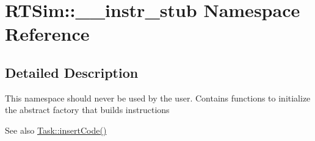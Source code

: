 \hypertarget{namespaceRTSim_1_1____instr__stub}{}\section{R\+T\+Sim\+:\+:\+\_\+\+\_\+instr\+\_\+stub Namespace Reference}
\label{namespaceRTSim_1_1____instr__stub}


\subsection{Detailed Description}
This namespace should never be used by the user. Contains functions to initialize the abstract factory that builds instructions \begin{DoxySeeAlso}{See also}
\hyperlink{classRTSim_1_1Task_adf7514e4b8692e09972c299f41f5d399}{Task\+::insert\+Code()} 
\end{DoxySeeAlso}
